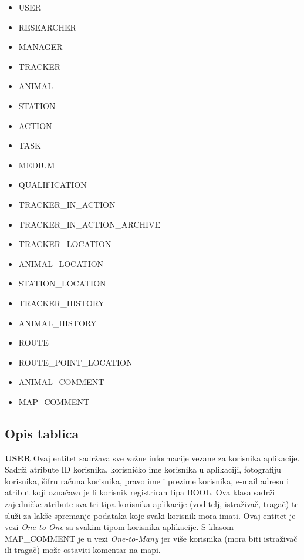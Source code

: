 				\begin{itemize}
					\item USER
					\item RESEARCHER
					\item MANAGER
					\item TRACKER
					\item ANIMAL
					\item STATION
					\item ACTION
					\item TASK
					\item MEDIUM
					\item QUALIFICATION
					\item TRACKER\_IN\_ACTION
					\item TRACKER\_IN\_ACTION\_ARCHIVE
					\item TRACKER\_LOCATION
					\item ANIMAL\_LOCATION
					\item STATION\_LOCATION
					\item TRACKER\_HISTORY
					\item ANIMAL\_HISTORY
					\item ROUTE
					\item ROUTE\_POINT\_LOCATION
					\item ANIMAL\_COMMENT
					\item MAP\_COMMENT
				\end{itemize}
				
		\subsection{Opis tablica}
				
				
				\noindent \textbf{USER} \hspace{1em} Ovaj entitet sadržava sve važne informacije vezane za korisnika aplikacije. Sadrži atribute ID korisnika, korisničko ime korisnika u aplikaciji, fotografiju korisnika, šifru računa korisnika, pravo ime i prezime korisnika, e-mail adresu i atribut koji označava je li korisnik registriran tipa BOOL.  Ova klasa sadrži zajedničke atribute sva tri tipa korisnika aplikacije (voditelj, istraživač, tragač) te služi za lakše spremanje podataka koje svaki korisnik mora imati. Ovaj entitet je  vezi \textit{One-to-One} sa svakim tipom korisnika aplikacije. S klasom MAP\_COMMENT je u vezi \textit{One-to-Many} jer više korisnika (mora biti istraživač ili tragač) može ostaviti komentar na mapi.
				
